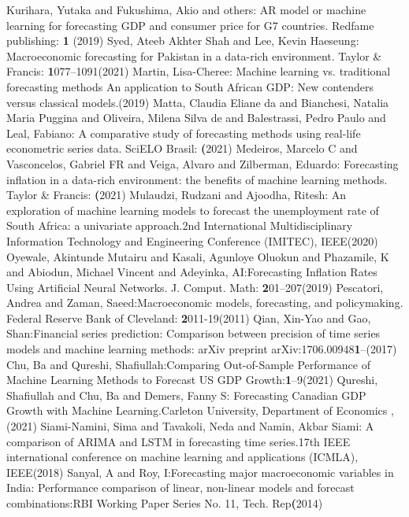 \documentclass[12pt,italian, twoside]{report}
\begin{document}
\begin{thebibliography}{8}
Kurihara, Yutaka and Fukushima, Akio and others: AR model or machine learning for forecasting GDP and consumer price for G7 countries.  Redfame publishing: \textbf1 (2019)
Syed, Ateeb Akhter Shah and Lee, Kevin Haeseung: Macroeconomic forecasting for Pakistan in a data-rich environment. Taylor \& Francis: \textbf1077--1091(2021)
Martin, Lisa-Cheree: Machine learning vs. traditional forecasting methods An application to South African GDP: New contenders versus classical models.(2019)
Matta, Claudia Eliane da and Bianchesi, Natalia Maria Puggina and Oliveira, Milena Silva de and Balestrassi, Pedro Paulo and Leal, Fabiano: A comparative study of forecasting methods using real-life econometric series data. SciELO Brasil: \textbf(2021)
Medeiros, Marcelo C and Vasconcelos, Gabriel FR and Veiga, Alvaro and Zilberman, Eduardo: Forecasting inflation in a data-rich environment: the benefits of machine learning methods. Taylor \& Francis: \textbf(2021)
Mulaudzi, Rudzani and Ajoodha, Ritesh: An exploration of machine learning models to forecast the unemployment rate of South Africa: a univariate approach.2nd International Multidisciplinary Information Technology and Engineering Conference (IMITEC), IEEE(2020)
Oyewale, Akintunde Mutairu and Kasali, Agunloye Oluokun and Phazamile, K and Abiodun, Michael Vincent and Adeyinka, AI:Forecasting Inflation Rates Using Artificial Neural Networks. J. Comput. Math: \textbf201--207(2019)
Pescatori, Andrea and Zaman, Saeed:Macroeconomic models, forecasting, and policymaking. Federal Reserve Bank of Cleveland: \textbf2011-19(2011)
Qian, Xin-Yao and Gao, Shan:Financial series prediction: Comparison between precision of time series models and machine learning methods: arXiv preprint arXiv:1706.00948\textbf1--(2017)
Chu, Ba and Qureshi, Shafiullah:Comparing Out-of-Sample Performance of Machine Learning Methods to Forecast US GDP Growth:\textbf1--9(2021)
Qureshi, Shafiullah and Chu, Ba and Demers, Fanny S: Forecasting Canadian GDP Growth with Machine Learning.Carleton University, Department of Economics , (2021)
Siami-Namini, Sima and Tavakoli, Neda and Namin, Akbar Siami: A comparison of ARIMA and LSTM in forecasting time series.17th IEEE international conference on machine learning and applications (ICMLA), IEEE(2018)
Sanyal, A and Roy, I:Forecasting major macroeconomic variables in India: Performance comparison of linear, non-linear models and forecast combinations:RBI Working Paper Series No. 11, Tech. Rep\textbf(2014)

\end{thebibliography}
\end{document}
